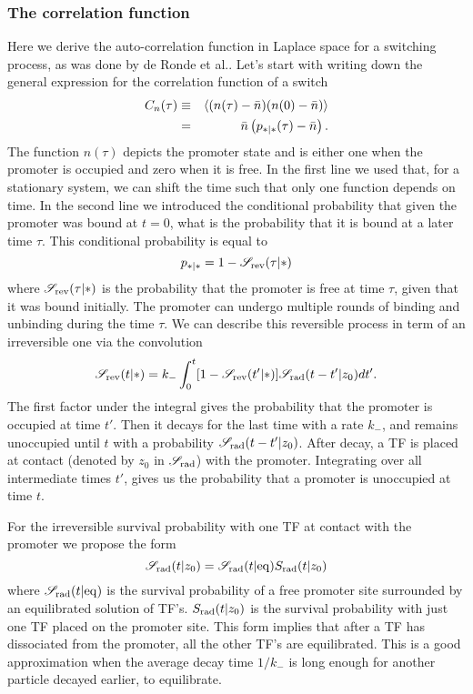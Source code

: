 \subsubsection{The correlation function}
Here we derive the auto-correlation function in Laplace space for a switching process, as was done by de Ronde et al.\cite{DeRonde2012}. Let's start with writing down the general expression for the correlation function of a switch
\begin{eqnarray}
 C_n(\tau) & \equiv & \left\langle (n(\tau) - \bar{n})(n(0) - \bar{n}) \right\rangle \\
  	& = & \bar{n} \left( p_{*|*}(\tau)-\bar{n} \right).
 \elabel{corr_func}
\end{eqnarray}
The function $n(\tau)$ depicts the promoter state and is either one when the promoter is occupied and zero when it is free. In the first line we used that, for a stationary system, we can shift the time such that only one function depends on time. In the second line we introduced the conditional probability that given the promoter was bound at $t=0$, what is the probability that it is bound at a later time $\tau$. This conditional probability is equal to
\begin{equation}
 p_{*|*} = 1 - \mathscr{S}_{\rm rev}(\tau|*)
\end{equation}
where $\mathscr{S}_{\rm rev}(\tau|*)$ is the probability that the promoter is free at time $\tau$, given that it was bound initially. The promoter can undergo multiple rounds of binding and unbinding during the time $\tau$. We can describe this reversible process in term of an irreversible one via the convolution \cite{Agmon1990}
\begin{equation}
 \mathscr{S}_{\rm rev}(t|*) = k_- \int_0^t [1-\mathscr{S}_{\rm rev}(t'|*)]\mathscr{S}_{\rm rad}(t-t'|z_0)dt'.
 \elabel{rev_conv}
\end{equation}
The first factor under the integral gives the probability that the promoter is occupied at time $t'$. Then it decays for the last time with a rate $k_-$, and remains unoccupied until $t$ with a probability $\mathscr{S}_{\rm rad}(t-t'|z_0)$. After decay, a TF is placed at contact (denoted by $z_0$ in $\mathscr{S}_{\rm rad}$) with the promoter. Integrating over all intermediate times $t'$, gives us the probability that a promoter is unoccupied at time $t$. 

For the irreversible survival probability with one TF at contact with the promoter we propose the form
\begin{equation}
 \mathscr{S}_{\rm rad}(t|z_0) = \mathscr{S}_{\rm rad}(t|{\rm eq}) S_{\rm rad}(t|z_0)
 \elabel{Def_Ssi}
\end{equation}
where $\mathscr{S}_{\rm rad}(t|{\rm eq})$ is the survival probability of a free promoter site surrounded by an equilibrated solution of TF's. $S_{\rm rad}(t|z_0)$ is the survival probability with just one TF placed on the promoter site. This form implies that after a TF has dissociated from the promoter, all the other TF's are equilibrated. This is a good approximation when the average decay time $1/k_-$ is long enough for another particle decayed earlier, to equilibrate. 

